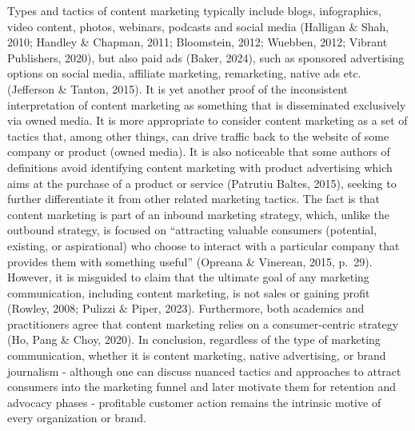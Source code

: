 \documentclass[preprint, 3p,
authoryear]{elsarticle} %
\begin{document}
Types and tactics of content marketing typically include blogs,
infographics, video content, photos, webinars, podcasts and social media
(Halligan \& Shah, 2010; Handley \& Chapman, 2011; Bloomstein, 2012;
Wuebben, 2012; Vibrant Publishers, 2020), but also paid ads (Baker,
2024), such as sponsored advertising options on social media, affiliate
marketing, remarketing, native ads etc. (Jefferson \& Tanton, 2015). It
is yet another proof of the inconsistent interpretation of content
marketing as something that is disseminated exclusively via owned media.
It is more appropriate to consider content marketing as a set of tactics
that, among other things, can drive traffic back to the website of some
company or product (owned media). It is also noticeable that some
authors of definitions avoid identifying content marketing with product
advertising which aims at the purchase of a product or service (Patrutiu
Baltes, 2015), seeking to further differentiate it from other related
marketing tactics. The fact is that content marketing is part of an
inbound marketing strategy, which, unlike the outbound strategy, is
focused on ``attracting valuable consumers (potential, existing, or
aspirational) who choose to interact with a particular company that
provides them with something useful'' (Opreana \& Vinerean, 2015,
p.~29). However, it is misguided to claim that the ultimate goal of any
marketing communication, including content marketing, is not sales or
gaining profit (Rowley, 2008; Pulizzi \& Piper, 2023). Furthermore, both
academics and practitioners agree that content marketing relies on a
consumer-centric strategy (Ho, Pang \& Choy, 2020). In conclusion,
regardless of the type of marketing communication, whether it is content
marketing, native advertising, or brand journalism - although one can
discuss nuanced tactics and approaches to attract consumers into the
marketing funnel and later motivate them for retention and advocacy
phases - profitable customer action remains the intrinsic motive of
every organization or brand.
\end{document}
